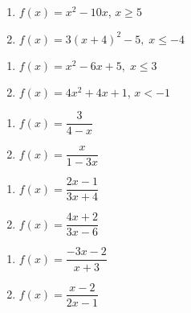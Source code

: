 \begin{multicols}{2}
\begin{enumerate}
\setcounter{enumi}{\value{HW}}

\item $f(x) = x^2 - 10x$, $x \geq 5$
\item $f(x) = 3(x + 4)^{2} - 5, \; x \leq -4$

\setcounter{HW}{\value{enumi}}
\end{enumerate}
\end{multicols}


\begin{multicols}{2}
\begin{enumerate}
\setcounter{enumi}{\value{HW}}

\item $f(x) = x^2-6x+5, \; x \leq 3$
\item $f(x) = 4x^2 + 4x + 1$, $x < -1$

\setcounter{HW}{\value{enumi}}
\end{enumerate}
\end{multicols}


\begin{multicols}{2}
\begin{enumerate}
\setcounter{enumi}{\value{HW}}

\item $f(x) = \dfrac{3}{4-x}$
\item $f(x) = \dfrac{x}{1-3x}$

\setcounter{HW}{\value{enumi}}
\end{enumerate}
\end{multicols}


\begin{multicols}{2}
\begin{enumerate}
\setcounter{enumi}{\value{HW}}

\item $f(x) = \dfrac{2x-1}{3x+4}$
\item $f(x) = \dfrac{4x + 2}{3x - 6}$

\setcounter{HW}{\value{enumi}}
\end{enumerate}
\end{multicols}


\begin{multicols}{2}
\begin{enumerate}
\setcounter{enumi}{\value{HW}}

\item $f(x) = \dfrac{-3x - 2}{x + 3}$ 

\item $f(x) = \dfrac{x-2}{2x-1}$  \label{inversehwlast}

\setcounter{HW}{\value{enumi}}
\end{enumerate}
\end{multicols}

